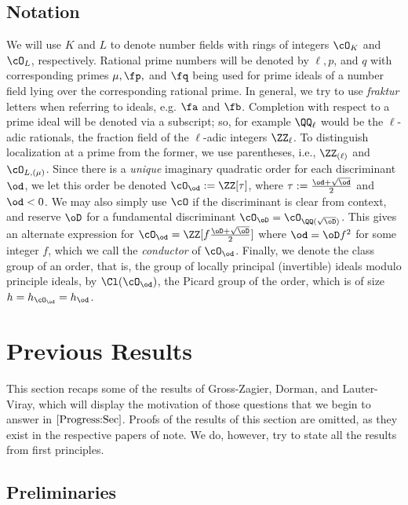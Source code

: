\documentclass[11pt, proquest]{uwthesis}
\begin{document}
\section{Notation}
  We will use $K$ and $L$ to denote number fields with rings of integers $\cO_K$ and $\cO_L$, respectively.
  Rational prime numbers will be denoted by $\ell,p$, and $q$ with corresponding primes $\mu, \fp,$ and $\fq$ being used for prime ideals of a number field lying over the corresponding rational prime.
  In general, we try to use {\it fraktur} letters when referring to ideals, e.g. $\fa$ and $\fb$.
  Completion with respect to a prime ideal will be denoted via a subscript; so, for example $\QQ_\ell$ would be the $\ell$-adic rationals, the fraction field of the $\ell$-adic integers $\ZZ_\ell$.
  To distinguish localization at a prime from the former, we use parentheses, i.e., $\ZZ_{(\ell)}$ and $\cO_{L,(\mu)}$.
  Since there is a {\it unique} imaginary quadratic order for each discriminant $\od$, we let this order be denoted $\cO_\od := \ZZ[\tau]$, where $\tau:= \frac{\od+\sqrt{\od}}{2}$ and $\od<0$.
  We may also simply use $\cO$ if the discriminant is clear from context, and reserve $\oD$ for a fundamental discriminant $\cO_\oD = \cO_{\QQ(\sqrt{\oD})}$.
  This gives an alternate expression for $\cO_\od = \ZZ[f\frac{\oD + \sqrt{\oD}}{2}]$ where $\od = \oD f^2$ for some integer $f$, which we call the {\it conductor} of $\cO_\od$.
  Finally, we denote the class group of an order, that is, the group of locally principal (invertible) ideals modulo principle ideals, by $\Cl(\cO_{\od})$, the Picard group of the order, which is of size $h=h_{\cO_{\od}}=h_\od$.


\chapter{Previous Results}

This section recaps some of the results of Gross-Zagier, Dorman, and Lauter-Viray, which will display the motivation of those questions that we begin to answer in \textsection$\ref{Progress:Sec}$. Proofs of the results of this section are omitted, as they exist in the respective papers of note. We do, however, try to state all the results from first principles.

\section{Preliminaries}
\end{document}
